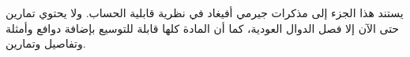 \documentclass[../../include/open-logic-part]{subfiles}
\begin{document}

\begin{editorial}
  يستند هذا الجزء إلى مذكرات جيرمي أفيغاد في نظرية قابلية الحساب. ولا
  يحتوي تمارين حتى الآن إلا فصل الدوال العودية، كما أن المادة كلها قابلة
  للتوسيع بإضافة دوافع وأمثلة وتفاصيل وتمارين.
\end{editorial}



\OLEndPartHook
\end{document}
